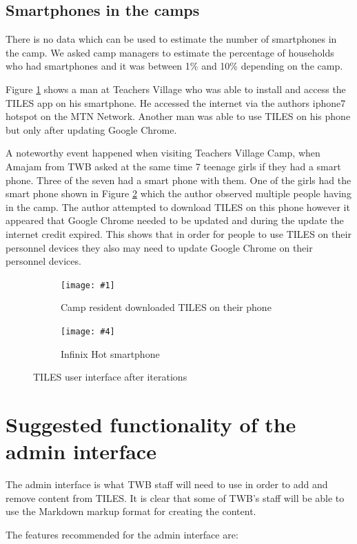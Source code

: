\documentclass[11pt]{article}
\newcommand*{\twoImages}[8]{
	\begin{figure}[H]
		\centering
		  \begin{subfigure}{0.475\textwidth}
			\texttt{[image: \#1]}
			  \caption{#2}
			  \label{#3}
		  \end{subfigure}
		  \hfill
		  \begin{subfigure}{0.475\textwidth}
			\texttt{[image: \#4]}
			  \caption{#5}
			  \label{#6}
		  \end{subfigure}
	\caption{#7}
	\label{#8}
	\end{figure}
}
\begin{document}
\subsection{Smartphones in the camps}
There is no data which can be used to estimate the number of smartphones in the camp. We asked camp managers to estimate the percentage of households who had smartphones and it was between 1\% and 10\% depending on the camp. 

Figure \ref{fig:mans_own_phone} shows a man at Teachers Village who was able to install and access the TILES app on his smartphone. He accessed the internet via the authors iphone7 hotspot on the MTN Network. Another man was able to use TILES on his phone but only after updating Google Chrome. 

A noteworthy event happened when visiting Teachers Village Camp, when Amajam from TWB asked at the same time 7 teenage girls if they had a smart phone. Three of the seven had a smart phone with them. One of the girls had the smart phone shown in Figure \ref{fig:inifix} which the author observed multiple people having in the camp. The author attempted to download TILES on this phone however it appeared that Google Chrome needed to be updated and during the update the internet credit expired. This shows that in order for people to use TILES on their personnel devices they also may need to update Google Chrome on their personnel devices. 

\twoImages{images/user_testing/smart_phone_tiles.png}
{Camp resident downloaded TILES on their phone}
{fig:mans_own_phone}
{images/user_testing/typical_phone.png}
{Infinix Hot smartphone}
{fig:inifix}
{TILES user interface after iterations}
{fig:final_tiles_ui}

\newpage
\section{Suggested functionality of the admin interface}

The admin interface is what TWB staff will need to use in order to add and remove content from TILES. It is clear that some of TWB's staff will be able to use the Markdown markup format for creating the content.

The features recommended for the admin interface are:
\end{document}

